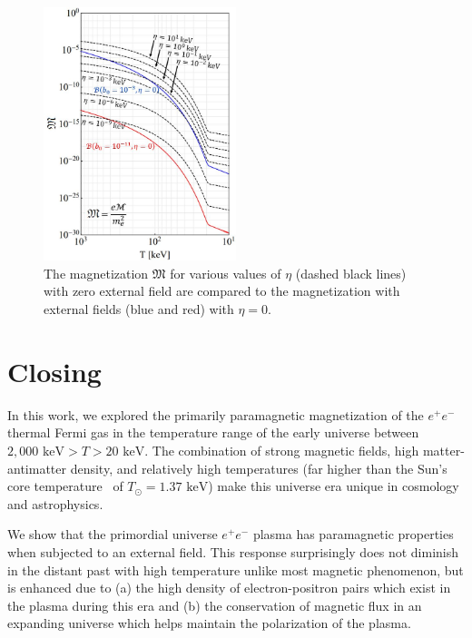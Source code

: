 \documentclass[a4paper]{article}
\newcommand*{\keV}{\text{ keV}}
\begin{document}
\begin{figure}[ht]
    \centering
    \includegraphics[width=0.5\textwidth]{plots/SpinPolarizationEffect_03.jpg}
    \caption{The magnetization ${\mathfrak M}$ for various values of $\eta$ (dashed black lines) with zero external field are compared to the magnetization with external fields (blue and red) with $\eta=0$.}
    \label{fig:ferro} 
\end{figure}

\section{Closing}
\label{sec:conclusions}
\noindent In this work, we explored the primarily paramagnetic magnetization of the $e^{+}e^{-}$ thermal Fermi gas in the temperature range of the early universe between $2,000\keV>T>20\keV$. The combination of strong magnetic fields, high matter-antimatter density, and relatively high temperatures (far higher than the Sun's core temperature~\cite{bahcall2001solar} of $T_{\odot}=1.37\keV$) make this universe era unique in cosmology and astrophysics.

We show that the primordial universe $e^{+}e^{-}$ plasma has paramagnetic properties when subjected to an external field. This response surprisingly does not diminish in the distant past with high temperature unlike most magnetic phenomenon, but is enhanced due to (a) the high density of electron-positron pairs which exist in the plasma during this era and (b) the conservation of magnetic flux in an expanding universe which helps maintain the polarization of the plasma.
\end{document}
